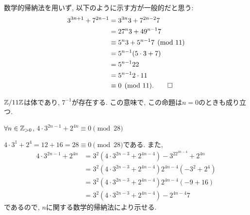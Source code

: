 \begin{rem}
  数学的帰納法を用いず, 以下のように示す方が一般的だと思う:
  \begin{align*}
    3^{3n+1}+7^{2n-1}
    &=3^{3n}3+7^{2n-2}7\\
    &=27^{n}3+49^{n-1}7\\
    &\equiv 5^n3+5^{n-1}7\pmod{11}\\
    &=5^{n-1}(5\cdot 3 + 7)\\
    &=5^{n-1}22\\
    &=5^{n-1}2\cdot 11\\
    &\equiv 0\pmod{11}
    .\qedhere
  \end{align*}
\end{rem}

\begin{rem}
  $\mathbb{Z}/11\mathbb{Z}$は体であり,
  $7^{-1}$が存在する.
  この意味で, この命題は$n=0$のときも成り立つ.
\end{rem}

\begin{prop}
  \label{p:20230807}
  $\forall n\in\mathbb{Z}_{>0}$,
  $4\cdot 3^{2n-1}+2^{4n}\equiv 0\pmod{28}$
\end{prop}

\begin{proof**}
  $4\cdot 3^{1}+2^{4}=12+16=28\equiv 0\pmod{28}$である.
  また,
  \begin{align*}
    4\cdot 3^{2n-1}+2^{4n}
    &=3^2(4\cdot 3^{2n-3}+2^{4n-4})
    -3^22^{4n-4}+2^{4n}\\
    &=3^2(4\cdot 3^{2n-3}+2^{4n-4})
    2^{4n-4}(-3^2+2^{4})\\
    &=3^2(4\cdot 3^{2n-3}+2^{4n-4})
    2^{4n-4}(-9+16)\\
    &=3^2(4\cdot 3^{2n-3}+2^{4n-4})
    -2^{4n-4}7
  \end{align*}
  であるので,
  $n$に関する数学的帰納法により示せる.
\end{proof**}

